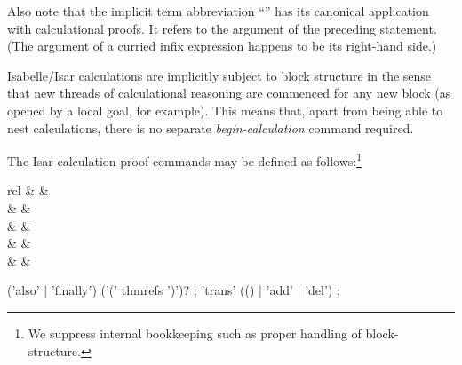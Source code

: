 \begin{isabellebody}
\begin{isamarkuptext}
  Also note that the implicit term abbreviation ``\isa{{\isachardoublequote}{\isasymdots}{\isachardoublequote}}'' has
  its canonical application with calculational proofs.  It refers to
  the argument of the preceding statement. (The argument of a curried
  infix expression happens to be its right-hand side.)

  Isabelle/Isar calculations are implicitly subject to block structure
  in the sense that new threads of calculational reasoning are
  commenced for any new block (as opened by a local goal, for
  example).  This means that, apart from being able to nest
  calculations, there is no separate \emph{begin-calculation} command
  required.

  \medskip The Isar calculation proof commands may be defined as
  follows:\footnote{We suppress internal bookkeeping such as proper
  handling of block-structure.}

  \begin{matharray}{rcl}
    \mbox{} & \equiv & \mbox{}~ \\
    \mbox{} & \equiv & \mbox{}~ \\[0.5ex]
    \mbox{} & \equiv & \mbox{}~\mbox{}~ \\[0.5ex]
    \mbox{} & \equiv & \mbox{}~ \\
    \mbox{} & \equiv & \mbox{}~\mbox{}~ \\
  \end{matharray}

  \begin{rail}
    ('also' | 'finally') ('(' thmrefs ')')?
    ;
    'trans' (() | 'add' | 'del')
    ;
  \end{rail}

  \begin{descr}


\end{descr}
\end{isamarkuptext}
\end{isabellebody}
